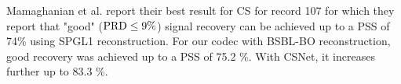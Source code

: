 Mamaghanian et al. \cite{mamaghanian2011compressed}
report their best result for CS for record 107
for which they report that "good" ($\mathrm{PRD} \leq 9\%$)
signal recovery can be achieved up to a PSS of 74\%
using SPGL1 reconstruction.
For our codec with BSBL-BO reconstruction, good
recovery was achieved up to a PSS of 75.2 \%.
With CSNet, it increases further up to 83.3 \%.
